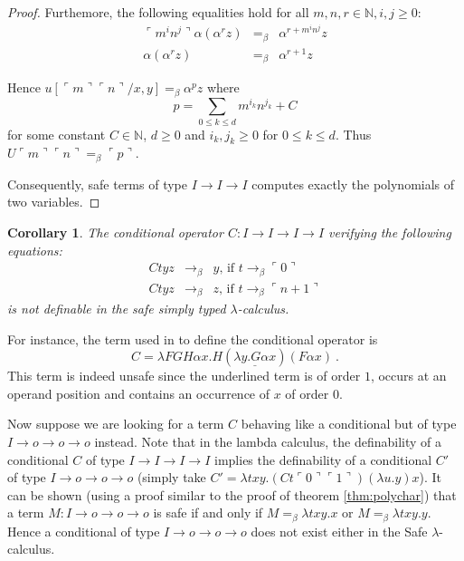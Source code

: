 \documentclass{article}
\newtheorem{corollary}[theorem]{Corollary}
\newcommand{\encode}[1]{\ulcorner #1 \urcorner}
\newcommand{\nat}{\mathbb{N}}
\begin{document}
\begin{proof}
Furthemore, the following equalities hold for all $m,n,r\in \nat,i,j\geq 0$:
\begin{eqnarray*}
\encode{m^i n^j} \alpha (\alpha^r z) &=_\beta&
\alpha^{r + m^i n^j} z \\
\alpha ( \alpha^r z ) &=_\beta& \alpha^{r+1} z
\end{eqnarray*}

Hence $u[\encode{m} \encode{n}/x,y] =_\beta \alpha^p z$ where
$$ p = \sum_{0\leq k \leq d} m^{i_k} n^{j_k} + C$$
for some constant $C \in \nat$, $d\geq 0$ and $i_k,j_k \geq 0$ for $0 \leq k \leq d$. Thus $U \encode{m} \encode{n} =_\beta \encode{p}$.

Consequently, safe terms of type $I \rightarrow I \rightarrow I$ computes
exactly the polynomials of two variables.
\end{proof}

\begin{corollary}
The conditional operator $C:I\rightarrow I\rightarrow I \rightarrow I$ verifying the following equations:
\begin{eqnarray*}
C t y z &\rightarrow_\beta& y \mbox{, if } t \rightarrow_\beta \encode{0} \\
C t y z &\rightarrow_\beta& z \mbox{, if } t \rightarrow_\beta \encode{n+1}
\end{eqnarray*}
is not definable in the safe simply typed $\lambda$-calculus.
\end{corollary}

For instance, the term used in \cite{citeulike:622637} to define the conditional operator is
$$ C = \lambda F G H \alpha x . H ( \underline{\lambda y . G \alpha x} ) (F \alpha x) \ .$$
This term is indeed unsafe since the underlined term is of order $1$, occurs at an operand position and contains an occurrence of $x$ of order $0$.

Now suppose we are looking for a term $C$ behaving like a conditional but of type $I\rightarrow o\rightarrow o \rightarrow o$ instead. Note that in the lambda calculus, the definability of a conditional $C$ of type $I\rightarrow I\rightarrow I \rightarrow I$ implies the definability of a conditional $C'$ of type $I\rightarrow o\rightarrow o \rightarrow o$ (simply take $C' = \lambda t x y . (C t \encode{0} \encode{1}) (\lambda u . y) x$).
It  can be shown (using a proof similar to the proof of theorem \ref{thm:polychar}) that a term $M:I\rightarrow o\rightarrow o \rightarrow o$  is safe if and only if $M =_\beta \lambda t x y . x$  or $M =_\beta \lambda t x y . y$. Hence a conditional of type $I\rightarrow o\rightarrow o \rightarrow o$ does not exist either in the Safe $\lambda$-calculus.
\end{document}
